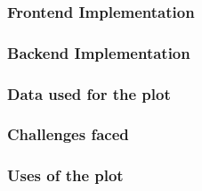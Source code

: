 \documentclass[12pt]{article}
\begin{document}
\subsubsection{Frontend Implementation}
\subsubsection{Backend Implementation}
\subsubsection{Data used for the plot}
\subsubsection{Challenges faced}
\subsubsection{Uses of the plot}
\end{document}
